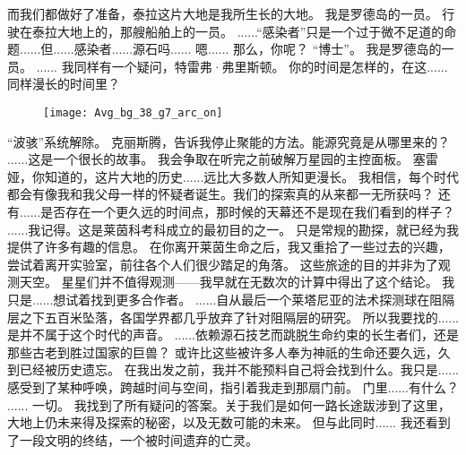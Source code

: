 \documentclass[openany]{book}
\begin{document}
\begin{dialogue}
     而我们都做好了准备，泰拉这片大地是我所生长的大地。
     我是罗德岛的一员。
     行驶在泰拉大地上的，那艘船舶上的一员。
     ......“感染者”只是一个过于微不足道的命题......但......感染者......源石吗......
     嗯......
     那么，你呢？
     “博士”。
     我是罗德岛的一员。
     ......
     我同样有一个疑问，特雷弗·弗里斯顿。
     你的时间是怎样的，在这......同样漫长的时间里？
    \begin{figure}[h]
        \centering
        \texttt{[image: Avg\_bg\_38\_g7\_arc\_on]}
    \end{figure}
     “波骇”系统解除。
     克丽斯腾，告诉我停止聚能的方法。能源究竟是从哪里来的？
     ......这是一个很长的故事。
     我会争取在听完之前破解万星园的主控面板。
     塞雷娅，你知道的，这片大地的历史......远比大多数人所知更漫长。
     我相信，每个时代都会有像我和我父母一样的怀疑者诞生。我们的探索真的从来都一无所获吗？
     还有......是否存在一个更久远的时间点，那时候的天幕还不是现在我们看到的样子？
     ......我记得。这是莱茵科考科成立的最初目的之一。
     只是常规的勘探，就已经为我提供了许多有趣的信息。
     在你离开莱茵生命之后，我又重拾了一些过去的兴趣，尝试着离开实验室，前往各个人们很少踏足的角落。
     这些旅途的目的并非为了观测天空。
     星星们并不值得观测——我早就在无数次的计算中得出了这个结论。
     我只是......想试着找到更多合作者。
     ......自从最后一个莱塔尼亚的法术探测球在阻隔层之下五百米坠落，各国学界都几乎放弃了针对阻隔层的研究。
     所以我要找的......是并不属于这个时代的声音。
     ......依赖源石技艺而跳脱生命约束的长生者们，还是那些古老到胜过国家的巨兽？
     或许比这些被许多人奉为神祇的生命还要久远，久到已经被历史遗忘。
     在我出发之前，我并不能预料自己将会找到什么。我只是......感受到了某种呼唤，跨越时间与空间，指引着我走到那扇门前。
     门里......有什么？
     ......
     一切。
     我找到了所有疑问的答案。关于我们是如何一路长途跋涉到了这里，大地上仍未来得及探索的秘密，以及无数可能的未来。
     但与此同时......
     我还看到了一段文明的终结，一个被时间遗弃的亡灵。
    \begin{figure}[h]
        \centering

\end{figure}
\end{dialogue}
\end{document}
